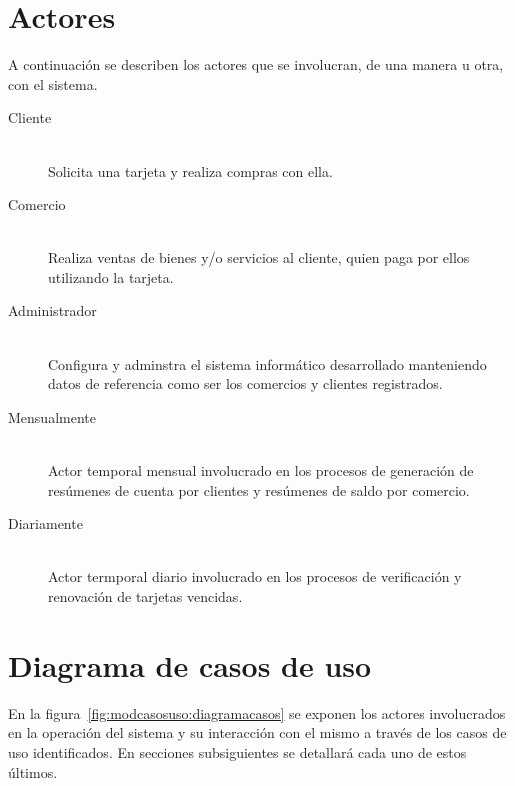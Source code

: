 \section{Actores}

A continuación se describen los actores que se involucran, de una manera u otra,
con el sistema.

\begin{description}

\item[Cliente] \hfill \\
Solicita una tarjeta y realiza compras con ella.

\item[Comercio] \hfill \\
Realiza ventas de bienes y/o servicios al cliente, quien paga por ellos
utilizando la tarjeta.

\item[Administrador] \hfill \\
Configura y adminstra el sistema informático desarrollado manteniendo datos de
referencia como ser los comercios y clientes registrados.

\item[Mensualmente] \hfill \\
Actor temporal mensual involucrado en los procesos de generación de resúmenes de
cuenta por clientes y resúmenes de saldo por comercio.

\item[Diariamente] \hfill \\
Actor termporal diario involucrado en los procesos de verificación y renovación
de tarjetas vencidas.

\end{description}

\section{Diagrama de casos de uso} \label{sec:diagrama_casos_uso}

En la figura~\ref{fig:modcasosuso:diagramacasos} se exponen los actores
involucrados en la operación del sistema y su interacción con el mismo a través
de los casos de uso identificados. En secciones subsiguientes se detallará cada
uno de estos últimos.

